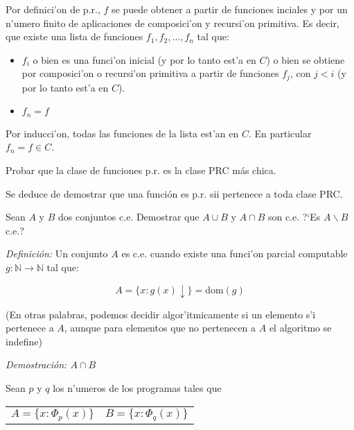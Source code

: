 \begin{questions}
\begin{solution}
\begin{itemize}
    Por definici'on de p.r., $f$ se puede obtener a partir de funciones inciales y por un n'umero finito de aplicaciones de composici'on y recursi'on primitiva. Es decir, que existe una lista de funciones $f_1, f_2, \dots, f_n$ tal que: 

    \begin{itemize}
    \item $f_i$ o bien es una funci'on inicial (y por lo tanto est'a en $C$) o bien se obtiene por composici'on o recursi'on primitiva a partir de funciones $f_j$, con $j < i$ (y por lo tanto est'a en $C$). 
    \item $f_n = f$
    \end{itemize}

    Por inducci'on, todas las funciones de la lista est'an en $C$. En particular $f_n = f \in C$. 
  \end{itemize}

\end{solution}

\question Probar que la clase de funciones p.r. es la clase PRC m\'as chica. 

\begin{solution}
 Se deduce de demostrar que una funci\'on es p.r. sii pertenece a toda clase PRC. 
\end{solution}

\question Sean $A$ y $B$ dos conjuntos c.e. Demostrar que $A \cup B$ y $A \cap B$ son c.e. ?`Es $A\backslash B$ c.e.?


\begin{solution}
  
  {\it Definici\'on:} Un conjunto $A$ es c.e. cuando existe una funci'on parcial computable $g: \mathbb{N} \rightarrow \mathbb{N}$ tal que: 

  \begin{equation*}
  A = \{ x : g(x) \downarrow \} = \text{dom}(g)
  \end{equation*}

  (En otras palabras, podemos decidir algor'itmicamente si un elemento s'i pertenece a $A$, aunque para elementos que no pertenecen a $A$ el algoritmo se indefine)

  {\it Demostraci\'on: $A \cap B$}

  Sean $p$ y $q$ los n'umeros de los programas tales que

  \begin{center}
  \begin{tabular}{ l r }
  \(\displaystyle A = \{ x : \Phi_p(x) \} \) & \(\displaystyle B = \{ x : \Phi_q(x) \} \) \\
  \end{tabular}
  \end{center}


\end{solution}
\end{questions}
